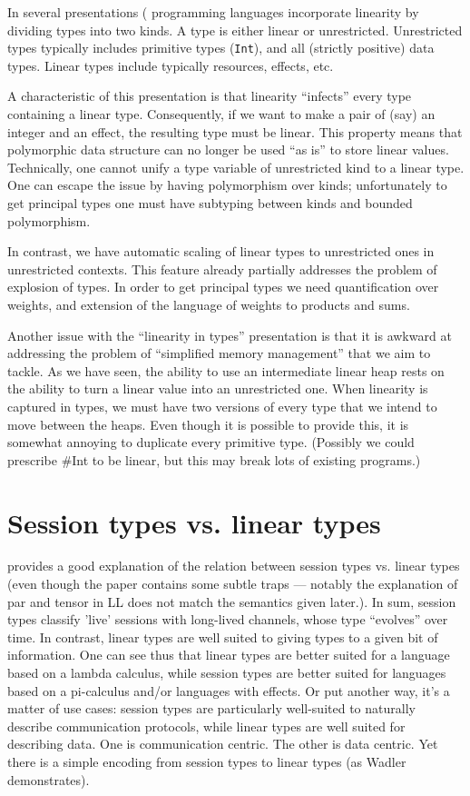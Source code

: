 \documentclass[11pt]{article}
\begin{document}
In several presentations (\cite{wadler_linear_1990,mazurak_lightweight_2010,morris_best_2016}
programming languages incorporate
linearity by dividing types into two kinds. A type is either linear
or unrestricted. Unrestricted types typically includes primitive types
(\texttt{Int}), and all (strictly positive) data types. Linear types
include typically resources, effects, etc.

A characteristic of this presentation is that linearity ``infects''
every type containing a linear type. Consequently, if we want to make
a pair of (say) an integer and an effect, the resulting type must be
linear. This property means that polymorphic data structure can no
longer be used ``as is'' to store linear values. Technically, one
cannot unify a type variable of unrestricted kind to a linear
type. One can escape the issue by having polymorphism over kinds;
unfortunately to get principal types one must have subtyping between
kinds and bounded polymorphism.

In contrast, we have automatic scaling of linear types to unrestricted
ones in unrestricted contexts. This feature already partially
addresses the problem of explosion of types. In order to get principal
types we need quantification over weights, and extension of the
language of weights to products and sums.

Another issue with the ``linearity in types'' presentation is that it
is awkward at addressing the problem of ``simplified memory
management'' that we aim to tackle. As we have seen, the ability to
use an intermediate linear heap rests on the ability to turn a linear
value into an unrestricted one. When linearity is captured in types,
we must have two versions of every type that we intend to move between
the heaps. Even though it is possible to provide this, it is somewhat
annoying to duplicate every primitive type. (Possibly we could
prescribe \#Int to be linear, but this may break lots of existing
programs.)

\section{Session types vs. linear types}

\Textcite{wadler_propositions_2012} provides a good explanation of
the relation between session types vs. linear types (even though the
paper contains some subtle traps --- notably the explanation of par
and tensor in LL does not match the semantics given later.). In sum,
session types classify 'live' sessions with long-lived channels, whose
type ``evolves'' over time. In contrast, linear types are well suited
to giving types to a given bit of information. One can see thus that
linear types are better suited for a language based on a lambda
calculus, while session types are better suited for languages based on
a pi-calculus and/or languages with effects. Or put another way,
it's a matter of use cases: session types are particularly well-suited
to naturally describe communication protocols, while linear types are
well suited for describing data. One is communication centric. The
other is data centric. Yet there is a simple
encoding from session types to linear types (as Wadler demonstrates).

\printbibliography
\end{document}
